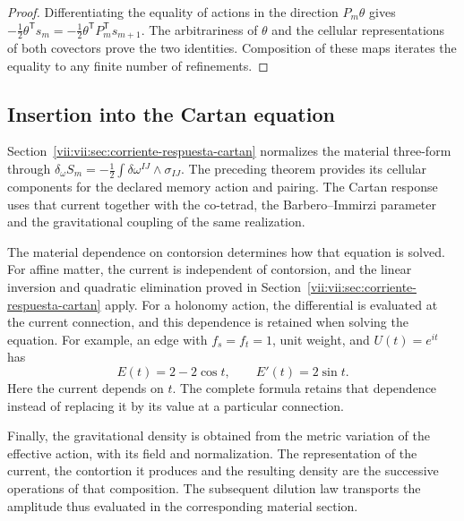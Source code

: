 \begin{proof}
Differentiating the equality of actions in the direction
\(P_m\theta\) gives
\(-\tfrac12\theta^{\mathsf T}s_m
 =-\tfrac12\theta^{\mathsf T}P_m^{\mathsf T}s_{m+1}\).
The arbitrariness of \(\theta\) and the cellular representations
of both covectors prove the two identities. Composition of
these maps iterates the equality to any finite number of refinements.
\end{proof}

\subsection{Insertion into the Cartan equation}

Section~\ref{vii:vii:sec:corriente-respuesta-cartan} normalizes the
material three-form through
\(\delta_\omega S_m=-\tfrac12\int\delta\omega^{IJ}\wedge
\sigma_{IJ}\). The preceding theorem provides its cellular
components for the declared memory action and pairing.
The Cartan response uses that current together with the co-tetrad,
the Barbero--Immirzi parameter and the gravitational coupling of the
same realization.

The material dependence on contorsion determines how that equation
is solved. For affine matter, the current is independent
of contorsion, and the linear inversion and quadratic elimination
proved in Section~\ref{vii:vii:sec:corriente-respuesta-cartan} apply.
For a holonomy
action, the differential is evaluated at the current connection, and
this dependence is retained when solving the equation. For example, an edge with
\(f_s=f_t=1\), unit weight, and \(U(t)=e^{it}\) has
\[
 E(t)=2-2\cos t,\qquad E'(t)=2\sin t.
\]
Here the current depends on \(t\). The complete formula retains
that dependence instead of replacing it by its value at a particular
connection.

Finally, the gravitational density is obtained from the metric
variation of the effective action, with its field and normalization.
The representation of the current, the contortion it produces and the
resulting density are the successive operations of that composition.
The subsequent dilution law transports the amplitude thus evaluated in
the corresponding material section.

